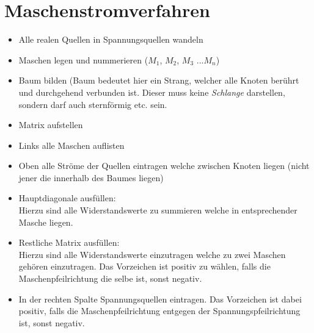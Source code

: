 



\section{Maschenstromverfahren}

\begin{itemize}
	\item Alle realen Quellen in Spannungsquellen wandeln
	\item Maschen legen und nummerieren ($M_1$, $M_2$, $M_3$ ...$M_n$)
	\item Baum bilden (Baum bedeutet hier ein Strang, welcher alle Knoten berührt und durchgehend verbunden ist. Dieser muss keine \textit{Schlange} darstellen, sondern darf auch sternförmig etc. sein.
	\item Matrix aufstellen
	\item Links alle Maschen auflisten
	\item Oben alle Ströme der Quellen eintragen welche zwischen Knoten liegen (nicht jener die innerhalb des Baumes liegen)
	\item Hauptdiagonale ausfüllen:\\ Hierzu sind alle Widerstandswerte zu summieren welche in entsprechender Masche liegen.
	\item Restliche Matrix ausfüllen:\\ Hierzu sind alle Widerstandswerte einzutragen welche zu zwei Maschen gehören einzutragen. Das Vorzeichen ist positiv zu wählen, falls die Maschenpfeilrichtung die selbe ist, sonst negativ.
	\item In der rechten Spalte Spannungsquellen eintragen. Das Vorzeichen ist dabei positiv, falls die Maschenpfeilrichtung entgegen der Spannungspfeilrichtung ist, sonst negativ.
\end{itemize}
